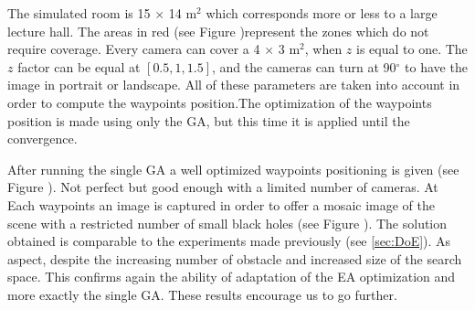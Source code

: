 	The simulated room is 15 $\times$ 14 m$^2$ which corresponds more or less to a large lecture hall. The areas in red (see Figure )represent the zones which do not require coverage. Every camera can cover a 4 $\times$ 3 m$^2$,  when $z$ is equal to one. The $z$ factor can be equal at $[0.5, 1, 1.5]$, and the cameras can turn  at 90$^{\circ}$ to have the image in portrait or landscape. All of these parameters are taken into account in order to compute the waypoints position.The optimization of the waypoints position is made using  only the GA, but this time it is applied until the convergence. 
	
	 After running the single GA  a well optimized waypoints positioning is given (see Figure ). Not perfect but good enough with a limited number of cameras. At Each waypoints an image is captured in order to offer a  mosaic image of the scene with a restricted number of small black holes (see Figure ).
	  The solution obtained is comparable to the experiments made previously (see \ref{sec:DoE}). As aspect, despite the increasing number of obstacle and increased size of the search space. This confirms again the ability of adaptation of the EA optimization and more exactly the single GA. These results encourage us to go  further. 


 




